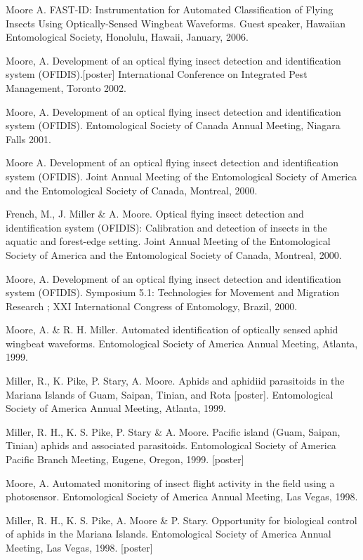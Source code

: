 \documentclass[12pt,english]{simplecv}
\begin{document}
\begin{thebibliography}{999}
Moore A. FAST-ID: Instrumentation for Automated Classification
of Flying Insects Using Optically-Sensed Wingbeat Waveforms. Guest
speaker, Hawaiian Entomological Society, Honolulu, Hawaii, January,
2006.

Moore, A. Development of an optical flying insect
detection and identification system (OFIDIS).{[}poster{]} International
Conference on Integrated Pest Management, Toronto 2002.

Moore, A. Development of an optical flying insect
detection and identification system (OFIDIS). Entomological Society
of Canada Annual Meeting, Niagara Falls 2001.

Moore A. Development of an optical flying insect
detection and identification system (OFIDIS). Joint Annual Meeting
of the Entomological Society of America and the Entomological Society
of Canada, Montreal, 2000.

French, M., J. Miller \& A. Moore. Optical flying
insect detection and identification system (OFIDIS): Calibration and
detection of insects in the aquatic and forest-edge setting. Joint
Annual Meeting of the Entomological Society of America and the Entomological
Society of Canada, Montreal, 2000.

Moore, A. Development of an optical flying insect
detection and identification system (OFIDIS). Symposium 5.1: Technologies
for Movement and Migration Research ; XXI International Congress of
Entomology, Brazil, 2000. 

Moore, A. \& R. H. Miller. Automated identification
of optically sensed aphid wingbeat waveforms. Entomological Society
of America Annual Meeting, Atlanta, 1999.

Miller, R., K. Pike, P. Stary, A. Moore. Aphids and
aphidiid parasitoids in the Mariana Islands of Guam, Saipan, Tinian,
and Rota {[}poster{]}. Entomological Society of America Annual Meeting,
Atlanta, 1999.

Miller, R. H., K. S. Pike, P. Stary \& A. Moore.
Pacific island (Guam, Saipan, Tinian) aphids and associated parasitoids.
Entomological Society of America Pacific Branch Meeting, Eugene, Oregon,
1999. {[}poster{]} 

Moore, A. Automated monitoring of insect flight activity
in the field using a photosensor. Entomological Society of America
Annual Meeting, Las Vegas, 1998.

Miller, R. H., K. S. Pike, A. Moore \& P. Stary.
Opportunity for biological control of aphids in the Mariana Islands.
Entomological Society of America Annual Meeting, Las Vegas, 1998.
{[}poster{]}


\end{thebibliography}
\end{document}
